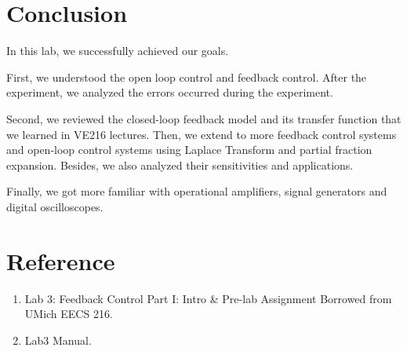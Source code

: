 \documentclass[a4paper]{article}
\begin{document}
\section{Conclusion}
In this lab, we successfully achieved our goals.

First, we understood the open loop control and feedback control. After the experiment, we analyzed the errors occurred during the experiment.

Second, we reviewed the closed-loop feedback model and its transfer function that we learned in VE216 lectures. Then, we extend to more feedback control systems and open-loop control systems using Laplace Transform and partial fraction expansion. Besides, we also analyzed their sensitivities and applications.

Finally, we got more familiar with operational amplifiers, signal generators and digital oscilloscopes.
\section{Reference}
\begin{enumerate}
	\item Lab 3: Feedback Control Part I: Intro \& Pre-lab Assignment Borrowed from UMich EECS 216.
	\item Lab3 Manual.
\end{enumerate}
\end{document}
